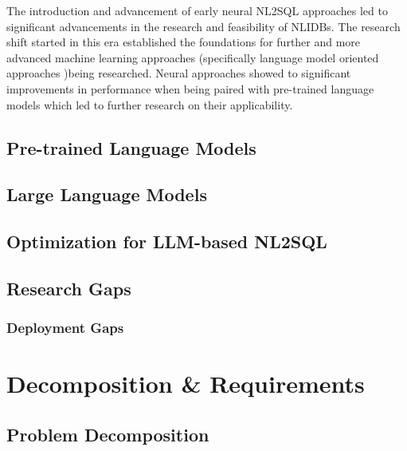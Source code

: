\documentclass{article}
\begin{document}
The introduction and advancement of early neural NL2SQL approaches led to significant advancements in the research and feasibility of NLIDBs. The
research shift started in this era established the foundations for further and more advanced machine learning approaches (specifically language
model oriented approaches )being researched. Neural approaches showed to significant improvements in performance when being paired with pre-trained
language models \citep{RATSQL} which led to further research on their applicability.

\subsection{Pre-trained Language Models}



\subsection{Large Language Models}

% 

\subsection{Optimization for LLM-based NL2SQL}


\subsection{Research Gaps}

\subsubsection{Deployment Gaps}

\newpage

\section{Decomposition \& Requirements}

\subsection{Problem Decomposition}
\end{document}
